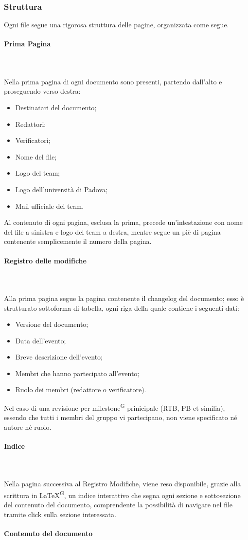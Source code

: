 \documentclass[8pt]{article}
\newcommand{\glossterm}[1]{#1\textsuperscript{G}} %
\newcommand{\subsubsubsection}[1]{\paragraph{#1}\mbox{}\\}
\begin{document}
\subsubsection{Struttura}
Ogni file segue una rigorosa struttura delle pagine, organizzata come segue.
\subsubsubsection{Prima Pagina}\\
Nella prima pagina di ogni documento sono presenti, partendo dall'alto e proseguendo verso destra:
\begin{itemize}
    \item Destinatari del documento;
    \item Redattori;
    \item Verificatori;
    \item Nome del file; 
    \item Logo del team;
    \item Logo dell'università di Padova;
    \item Mail ufficiale del team.
\end{itemize}
Al contenuto di ogni pagina, esclusa la prima, precede un'intestazione con nome del file a sinistra e logo del team a destra, mentre segue un piè di pagina contenente semplicemente il numero della pagina. 
\subsubsubsection{Registro delle modifiche}\\
Alla prima pagina segue la pagina contenente il changelog del documento; esso è strutturato sottoforma di tabella, ogni riga della quale contiene i seguenti dati:
\begin{itemize}
    \item Versione del documento;
    \item Data dell'evento;
    \item Breve descrizione dell'evento;
    \item Membri che hanno partecipato all'evento;
    \item Ruolo dei membri (redattore o verificatore).
\end{itemize}
Nel caso di una revisione per \glossterm{milestone} prinicipale (RTB, PB et similia), essendo che tutti i membri del gruppo vi partecipano, non viene specificato né autore né ruolo. 
\subsubsubsection{Indice}\\
Nella pagina successiva al Registro Modifiche, viene reso disponibile, grazie alla scrittura in \glossterm{\LaTeX}, un indice interattivo che segna ogni sezione e sottosezione del contenuto del documento, comprendente la possibilità di navigare nel file tramite click sulla sezione interessata.
\subsubsubsection{Contenuto del documento}\\
\end{document}
